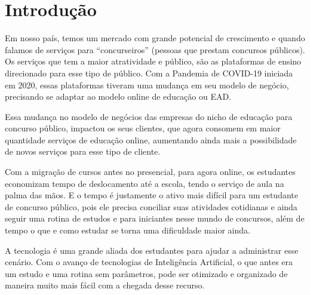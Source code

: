 \chapter{Introdução}


Em nosso país, temos um mercado com grande potencial de crescimento e quando falamos de serviços para “concurseiros” (pessoas que prestam concursos públicos). Os serviços que tem a maior atratividade e público, são as plataformas de ensino direcionado para esse tipo de público. Com a Pandemia de COVID-19 iniciada em 2020, essas plataformas tiveram uma mudança em seu modelo de negócio, precisando se adaptar ao modelo online de educação ou EAD. 

Essa mudança no modelo de negócios das empresas do nicho de educação para concurso público, impactou os seus clientes, que agora consomem em maior quantidade serviços de educação online, aumentando ainda mais a possibilidade de novos serviços para esse tipo de cliente.

Com a migração de cursos antes no presencial, para agora online, os estudantes economizam tempo de deslocamento até a escola, tendo o serviço de aula na palma das mãos. E o tempo é justamente o ativo mais difícil para um estudante de concurso público, pois ele precisa conciliar suas atividades cotidianas e ainda seguir uma rotina de estudos e para iniciantes nesse mundo de concursos, além de tempo o que e como estudar se torna uma dificuldade maior ainda.

A tecnologia é uma grande aliada dos estudantes para ajudar a administrar esse cenário. Com o avanço de tecnologias de Inteligência Artificial, o que antes era um estudo e uma rotina sem parâmetros, pode ser otimizado e organizado de maneira muito mais fácil com a chegada desse recurso.







